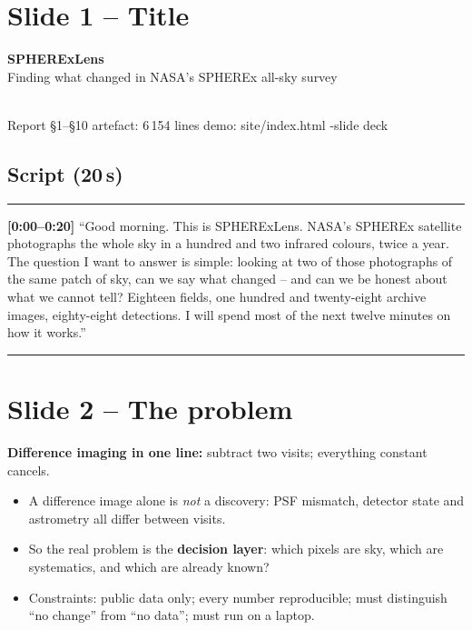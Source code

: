 \documentclass[11pt,a4paper]{article}
\begin{document}
\newpage

\section{Slide 1 -- Title}
\begin{center}
\textbf{\Large SPHERExLens}\\[4pt]
{\normalsize\color{slate} Finding what changed in NASA's SPHEREx all-sky survey}\\[10pt]
\\[6pt]
{\small\color{muted} Report \S1--\S10 \;\textbullet\; artefact: 6\,154 lines \;\textbullet\; demo: site/index.html \;\textbullet{}-slide deck}
\end{center}

\subsection*{Script (20\,s)}
\noindent\rule{\linewidth}{0.3pt}\par\smallskip\noindent
\textbf{[0:00--0:20]} ``Good morning. This is SPHERExLens. NASA's SPHEREx satellite photographs the
whole sky in a hundred and two infrared colours, twice a year. The question I want to answer is simple:
looking at two of those photographs of the same patch of sky, can we say what changed -- and can we be
honest about what we cannot tell? Eighteen fields, one hundred and twenty-eight archive images,
eighty-eight detections. I will spend most of the next twelve minutes on how it works.''
\par\smallskip\noindent\rule{\linewidth}{0.3pt}

\section{Slide 2 -- The problem}

\textbf{Difference imaging in one line:} subtract two visits; everything constant cancels.

\begin{itemize}[leftmargin=1.1em,itemsep=3pt]
\item A difference image alone is \emph{not} a discovery: PSF mismatch, detector state and astrometry
      all differ between visits.
\item So the real problem is the \textbf{decision layer}: which pixels are sky, which are systematics,
      and which are already known?
\item Constraints: public data only; every number reproducible; must distinguish ``no change'' from
      ``no data''; must run on a laptop.
\end{itemize}
\end{document}
